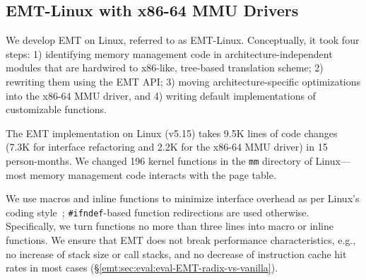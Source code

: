 \subsection{EMT-Linux with x86-64 MMU Drivers}
\label{emt:sec:impl}

\noindent
We develop EMT on Linux, referred to as EMT-Linux.
Conceptually, it took four steps:
1) identifying memory management code in architecture-independent modules 
    that are hardwired to x86-like, tree-based translation scheme;
2) rewriting them using the EMT API;
3) moving architecture-specific optimizations 
    into
	the x86-64 MMU driver,
and 4) writing default implementations of 
    customizable functions.


The EMT implementation on Linux (v5.15)
    takes 9.5K lines of code changes 
	(7.3K for interface refactoring and 2.2K for the x86-64 MMU driver)
    in 15 person-months.
We changed 196 kernel functions in the \texttt{\small mm} directory of Linux---most 
    memory management code interacts with the page table.

We use macros and inline functions
	to minimize interface overhead as per Linux's coding style~\cite{linux:code:icache}; 
	\texttt{\small \#ifndef}-based function redirections are used otherwise.
Specifically, we turn functions no more than three lines into macro or inline functions. 
We ensure that EMT does not break performance characteristics, e.g., 
	no increase of stack size or call stacks, and no decrease 
	of instruction cache hit rates in most cases (\S\ref{emt:sec:eval:eval-EMT-radix-vs-vanilla}). 

